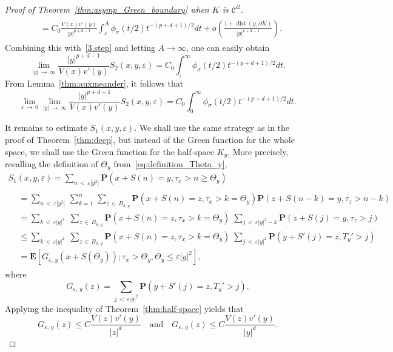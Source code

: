 \documentclass[10pt]{amsart}
\theoremstyle{definition}\newtheorem{defi}[theo]{Definition}\newtheorem{rema}[theo]{Remark}\newtheorem{exam}[theo]{Example}\newtheorem{exem}[theo]{Example}\newtheorem{nota}[theo]{Notation}
\DeclareMathOperator{\dist}{dist}
\newcommand{\clC}{\mathcal{C}}
\newcommand{\pr}{\mathbf{P}}
\newcommand{\e}{\mathbf{E}}
\renewcommand{\epsilon}{\varepsilon}
\renewcommand{\le}{\leqslant}
\renewcommand{\ge}{\geqslant}
\renewcommand{\leq}{\leqslant}
\begin{document}
\begin{proof}[Proof of Theorem~\ref{thm:asymp_Green_boundary} when $K$ is $\clC^{2}$]
\begin{multline*}
\begin{aligned}
&= C_0\frac{V(x)v'(y)}{|y|^{p+d-1}}\int_\varepsilon^A\phi_\sigma(t/2) t^{-(p+d+1)/2}dt +o\left(\frac{1+\dist(y, \partial K)}{|y|^{p+d-1}}\right).
\end{aligned}
\end{multline*}
Combining this with~\eqref{3.step} and letting $A\to\infty$, one can easily obtain
\[
\lim_{|y|\,\to\,\infty}\frac{|y|^{p+d-1}}{V(x)v'(y)}S_2(x,y,\varepsilon) =C_0\int_\varepsilon^\infty \phi_\sigma(t/2) t^{-(p+d+1)/2}dt.
\]
From Lemma~\ref{thm:auxmeander}, it follows that
\begin{equation}\label{S2.boundary}
\lim_{\varepsilon\,\to\,0}\lim_{|y|\,\to\,\infty}\frac{|y|^{p+d-1}}{V(x)v'(y)}S_2(x,y,\varepsilon) =C_0\int_0^\infty \phi_\sigma(t/2) t^{-(p+d+1)/2}dt.
\end{equation}

It remains to estimate $S_1(x,y,\varepsilon)$. We shall use the same strategy as in the proof of Theorem~\ref{thm:deep}, but instead of the Green function for the whole space, we shall use the Green function for the half-space $K_y$. More precisely, recalling the definition of $\Theta_y$ from~\eqref{eq:definition_Theta_y},
\begin{multline*}
S_1(x,y,\varepsilon)=\sum_{n\,<\,\varepsilon\left|y^2\right|}\pr\left(x+S(n)=y,\tau_x>n\ge\Theta_y\right)\\
\begin{aligned}
&=\sum_{n\,<\,\varepsilon\left|y^2\right|}\,\sum_{k=1}^n\,\sum_{z\,\in\,B_{\delta,\,y}}\!\!
\pr\left(x+S(n)=z,\tau_x>k=\Theta_y\right)\pr\left(z+S(n-k)=y,\tau_z>n-k\right)\\
&= \sum_{k\,<\,\varepsilon|y|^2}\;\sum_{z\,\in\,B_{\delta,\,y}}
\pr\left(x+S(n)=z,\tau_x>k=\Theta_y\right)\;\sum_{j\,<\,\varepsilon|y|^2-k}\pr\left(z+S(j)=y,\tau_z>j\right)\\
&\le \sum_{k\,<\,\varepsilon|y|^2}\;\sum_{z\,\in\, B_{\delta,\,y}}
\pr\left(x+S(n)=z,\tau_x>k=\Theta_y\right)\;\sum_{j\,<\,\varepsilon|y|^2}\pr\left(y+S'(j)=z,T_y'>j\right)\\
&=\e\left[G_{\varepsilon,\,y}\left(x+S\left(\Theta_y\right)\right);\tau_x>\Theta_y,\Theta_y\le\varepsilon|y|^2\right],
\end{aligned}
\end{multline*}
where
\[
G_{\varepsilon,\,y}(z)=\sum_{j\,<\,\varepsilon|y|^2}\pr\left(y+S'(j)=z,T_y'>j\right).
\]
Applying the inequality of Theorem~\ref{thm:half-space} yields that
\[
G_{\epsilon,\,y}(z)\leq C\frac{V(z)v'(y)}{|z|^d}\quad\text{and}\quad G_{\epsilon,\,y}(z)\leq C\frac{V(z)v'(y)}{|y|^d}.
\]
\end{proof}
\end{document}
